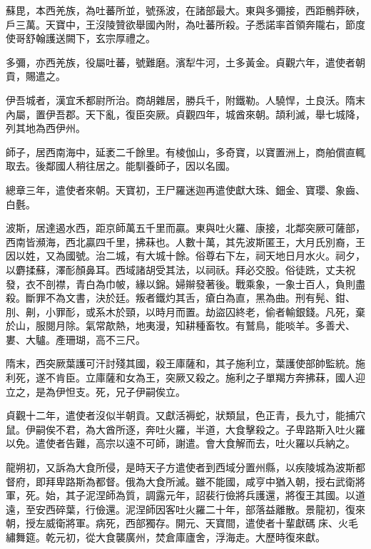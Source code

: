 \begin{pinyinscope}
 蘇毘，本西羌族，為吐蕃所並，號孫波，在諸部最大。東與多彌接，西距鶻莽硤，戶三萬。天寶中，王沒陵贊欲舉國內附，為吐蕃所殺。子悉諾率首領奔隴右，節度使哥舒翰護送闕下，玄宗厚禮之。



 多彌，亦西羌族，役屬吐蕃，號難磨。濱犁牛河，土多黃金。貞觀六年，遣使者朝貢，賜遣之。



 伊吾城者，漢宜禾都尉所治。商胡雜居，勝兵千，附鐵勒。人驍悍，土良沃。隋末內屬，置伊吾郡。天下亂，復臣突厥。貞觀四年，城酋來朝。頡利滅，舉七城降，列其地為西伊州。



 師子，居西南海中，延袤二千餘里。有棱伽山，多奇寶，以寶置洲上，商舶償直輒取去。後鄰國人稍往居之。能馴養師子，因以名國。



 總章三年，遣使者來朝。天寶初，王尸羅迷迦再遣使獻大珠、鈿金、寶瓔、象齒、白氎。



 波斯，居達遏水西，距京師萬五千里而贏。東與吐火羅、康接，北鄰突厥可薩部，西南皆瀕海，西北贏四千里，拂菻也。人數十萬，其先波斯匿王，大月氏別裔，王因以姓，又為國號。治二城，有大城十餘。俗尊右下左，祠天地日月水火。祠夕，以麝揉蘇，澤耏顏鼻耳。西域諸胡受其法，以祠祅。拜必交股。俗徒跣，丈夫祝發，衣不剖襟，青白為巾帔，緣以錦。婦辮發著後。戰乘象，一象士百人，負則盡殺。斷罪不為文書，決於廷。叛者鐵灼其舌，瘡白為直，黑為曲。刑有髡、鉗、刖、劓，小罪耏，或系木於頸，以時月而置。劫盜囚終老，偷者輸銀錢。凡死，棄於山，服閱月除。氣常歊熱，地夷漫，知耕種畜牧。有鷲鳥，能啖羊。多善犬、婁、大驢。產珊瑚，高不三尺。



 隋末，西突厥葉護可汗討殘其國，殺王庫薩和，其子施利立，葉護使部帥監統。施利死，遂不肯臣。立庫薩和女為王，突厥又殺之。施利之子單羯方奔拂菻，國人迎立之，是為伊怛支。死，兄子伊嗣俟立。



 貞觀十二年，遣使者沒似半朝貢。又獻活褥蛇，狀類鼠，色正青，長九寸，能捕穴鼠。伊嗣俟不君，為大酋所逐，奔吐火羅，半道，大食擊殺之。子卑路斯入吐火羅以免。遣使者告難，高宗以遠不可師，謝遣。會大食解而去，吐火羅以兵納之。



 龍朔初，又訴為大食所侵，是時天子方遣使者到西域分置州縣，以疾陵城為波斯都督府，即拜卑路斯為都督。俄為大食所滅。雖不能國，咸亨中猶入朝，授右武衛將軍，死。始，其子泥涅師為質，調露元年，詔裴行儉將兵護還，將復王其國。以道遠，至安西碎葉，行儉還。泥涅師因客吐火羅二十年，部落益離散。景龍初，復來朝，授左威衛將軍。病死，西部獨存。開元、天寶間，遣使者十輩獻碼床、火毛繡舞筵。乾元初，從大食襲廣州，焚倉庫廬舍，浮海走。大歷時復來獻。




\end{pinyinscope}
